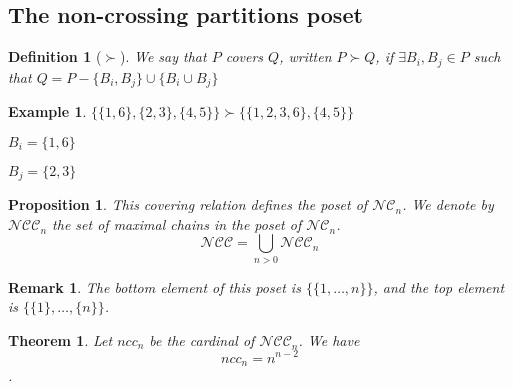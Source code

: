 \documentclass[12pt]{report}
\newtheorem{theorem}{Theorem}
\newtheorem*{prop}{Proposition}
\newtheorem{definition}{Definition}
\newtheorem*{example}{Example}
\newtheorem*{rem}{Remark}
\begin{document}
\subsection{The non-crossing partitions poset}

\begin{definition}[$\succ$]
    We say that $P$ covers $Q$, written $P \succ Q$,
    if $\exists B_i, B_j \in P$ such that
    $Q = P - \{B_i, B_j\} \cup \{B_i \cup B_j\}$    
\end{definition}

\begin{example}
    $\{\{1, 6\}, \{2, 3\}, \{4, 5\}\} \succ
    \{\{1, 2, 3, 6\}, \{4, 5\}\}$\\
    \begin{itemize*}
        \item $B_i = \{1, 6\}$\\
        \item $B_j = \{2, 3\}$\\
    \end{itemize*}
\end{example}

\begin{prop}
    This covering relation defines the \emph{poset}
    of $\mathcal{NC}_n$.
    We denote by $\mathcal{NCC}_n$ the set of
    \emph{maximal chains} in the poset of $\mathcal{NC}_n$.\\
    $$\mathcal{NCC} = \bigcup_{n > 0}{\mathcal{NCC}_n}$$
\end{prop}

\begin{rem}
    The bottom element of this poset is $\{\{1, \ldots, n\}\}$,
    and the top element is $\{\{1\}, \ldots, \{n\}\}$.
\end{rem}

\begin{theorem}
    Let $ncc_n$ be the cardinal of $\mathcal{NCC}_n$.
    We have $$ncc_n = n^{n - 2}$$.
\end{theorem}
\end{document}
